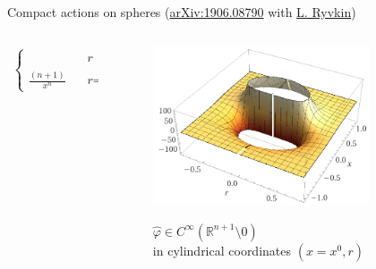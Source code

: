 \documentclass[final,a0paper,20pt,
						pdftex,
            pdfauthor={Antonio Michele Miti},
            pdftitle={Homotopy title},
            pdfsubject={Poster for the conference Super19 in Luxembourg},
            pdfkeywords={Some Keywords},
            pdfproducer={Latex with hyperref, or other system},
            pdfcreator={pdflatex, or other tool}
            ]{beamer}
\newcommand{\pinned}[1]{
    \faThumbTack 
    \hfill
    #1
    \hfill \faThumbTack
    \\
    }
\begin{document}
\begin{frame}[t]
\begin{columns}[t]
\begin{column}{\onecolwid}
\begin{block}{\pinned{Compact actions on spheres
	{\small(\href{http://arxiv.org/abs/1906.08790}{arXiv:1906.08790} with \href{http://www.ryvkin.eu/}{L. Ryvkin}) 
	}}}
\begin{propblock}
\begin{columns}[T]
\begin{column}{.5\linewidth}
\begin{displaymath}
\begin{array}{ll}
\begin{cases}
								&~\text{ $r$ $\neq$ $0$}
								\\
								\frac{(n+1)}{x^n} 
								&~\text{ $r$=$0$, $x$ $\neq$ $0$}
						\end{cases}
					\end{array}					
				\end{displaymath}
			\end{column}	
	  	\hfill  	
			\begin{column}{.50\linewidth}
				\vspace{-1ex}
				\begin{flushright}
				\raggedleft
					\begin{figure}
						\vspace{0.5em}
						\href{http://shorturl.at/hxFR5}{\includegraphics[width=0.8\textwidth]{Pictures/Figure_primitivePlot.png}}
  					\caption*{$\hat{\varphi}\in C^\infty (\mathbb{R}^{n+1}\setminus{0})$ \\ in cylindrical coordinates $(x=x^0,r)$}
					\end{figure}							
				\end{flushright}
				\vspace{-3.5ex}
	 	 	\end{column}
 	 \end{columns}
	\end{propblock}


	\end{block}



\end{column}
\end{columns}
\end{frame}
\end{document}
